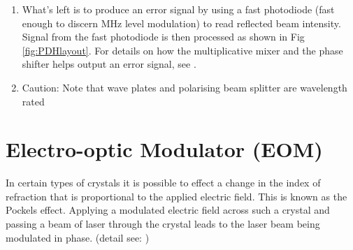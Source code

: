 \documentclass[12pt]{report}
\begin{document}
\begin{enumerate}
    \item What's left is to produce an error signal by using a fast photodiode (fast enough to discern MHz level modulation) to read reflected beam intensity. Signal from the fast photodiode is then processed as shown in Fig \ref{fig:PDHlayout}. For details on how the multiplicative mixer and the phase shifter helps output an error signal, see \cite{PDHintro}.

    \item Caution: Note that wave plates and polarising beam splitter are wavelength rated
\end{enumerate}

\section{Electro-optic Modulator (EOM)}
In certain types of crystals it is possible to effect a change in the index of refraction that is proportional to the applied electric field. This is known as the Pockels effect. Applying a modulated electric field across such a crystal and passing a beam of laser through the crystal leads to the laser beam being modulated in phase. (detail see: \cite{fundamentalsOfPhotonics}) 
\end{document}
